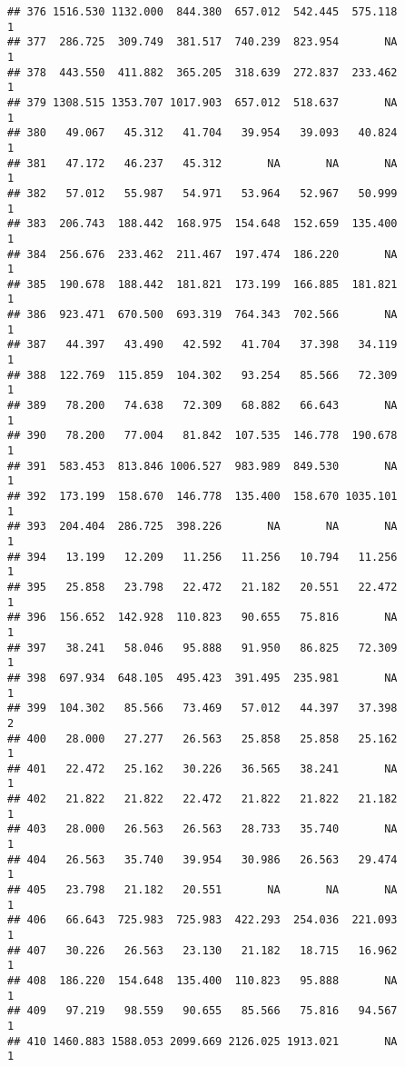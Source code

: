 \documentclass[
]{article}
\begin{document}
\begin{verbatim}
## 376 1516.530 1132.000  844.380  657.012  542.445  575.118             1
## 377  286.725  309.749  381.517  740.239  823.954       NA             1
## 378  443.550  411.882  365.205  318.639  272.837  233.462             1
## 379 1308.515 1353.707 1017.903  657.012  518.637       NA             1
## 380   49.067   45.312   41.704   39.954   39.093   40.824             1
## 381   47.172   46.237   45.312       NA       NA       NA             1
## 382   57.012   55.987   54.971   53.964   52.967   50.999             1
## 383  206.743  188.442  168.975  154.648  152.659  135.400             1
## 384  256.676  233.462  211.467  197.474  186.220       NA             1
## 385  190.678  188.442  181.821  173.199  166.885  181.821             1
## 386  923.471  670.500  693.319  764.343  702.566       NA             1
## 387   44.397   43.490   42.592   41.704   37.398   34.119             1
## 388  122.769  115.859  104.302   93.254   85.566   72.309             1
## 389   78.200   74.638   72.309   68.882   66.643       NA             1
## 390   78.200   77.004   81.842  107.535  146.778  190.678             1
## 391  583.453  813.846 1006.527  983.989  849.530       NA             1
## 392  173.199  158.670  146.778  135.400  158.670 1035.101             1
## 393  204.404  286.725  398.226       NA       NA       NA             1
## 394   13.199   12.209   11.256   11.256   10.794   11.256             1
## 395   25.858   23.798   22.472   21.182   20.551   22.472             1
## 396  156.652  142.928  110.823   90.655   75.816       NA             1
## 397   38.241   58.046   95.888   91.950   86.825   72.309             1
## 398  697.934  648.105  495.423  391.495  235.981       NA             1
## 399  104.302   85.566   73.469   57.012   44.397   37.398             2
## 400   28.000   27.277   26.563   25.858   25.858   25.162             1
## 401   22.472   25.162   30.226   36.565   38.241       NA             1
## 402   21.822   21.822   22.472   21.822   21.822   21.182             1
## 403   28.000   26.563   26.563   28.733   35.740       NA             1
## 404   26.563   35.740   39.954   30.986   26.563   29.474             1
## 405   23.798   21.182   20.551       NA       NA       NA             1
## 406   66.643  725.983  725.983  422.293  254.036  221.093             1
## 407   30.226   26.563   23.130   21.182   18.715   16.962             1
## 408  186.220  154.648  135.400  110.823   95.888       NA             1
## 409   97.219   98.559   90.655   85.566   75.816   94.567             1
## 410 1460.883 1588.053 2099.669 2126.025 1913.021       NA             1

\end{verbatim}
\end{document}
